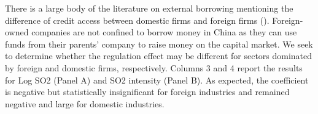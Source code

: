 \documentclass[12pt]{article}
\begin{document}
There is a large body of the literature on external borrowing mentioning the difference of credit access between domestic firms and foreign firms (\cite{Poncet2010-vv, Jarreau2014-lb, Manova2015-zk}). Foreign-owned companies are not confined to borrow money in China as they can use funds from their parents' company to raise money on the capital market. We seek to determine whether the regulation effect may be different for sectors dominated by foreign and domestic firms, respectively. Columns 3 and 4 report the results for Log SO2 (Panel A) and SO2 intensity (Panel B). As expected, the coefficient is negative but statistically insignificant for foreign industries and remained negative and large for domestic industries.

\begin{table}[htbp]\centering
{}
\end{table}
\end{document}

